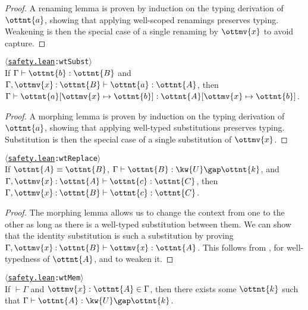 \documentclass[a4paper,UKenglish,cleveref,autoref,thm-restate]{lipics-v2021}
\newcommand{\repo}{https://github.com/ionathanch/TTBFL}
\newcommand{\thmref}[2]{%
  $\langle$\href{\repo/tree/main/src/#1}{\texttt{#1}}\texttt{:#2}$\rangle$%
}
\begin{document}
\begin{proof}
  A renaming lemma is proven by induction on the typing derivation of $\ottnt{a}$,
  showing that applying well-scoped renamings preserves typing.
  Weakening is then the special case of a single renaming by $\ottmv{x}$ to avoid capture.
\end{proof}

\begin{lemma}[Substitution (w.t.)] \thmref{safety.lean}{wtSubst} \label{lem:wt:subst} \\
  If $ \Gamma  \vdash  \ottnt{b}  \mathrel{:}  \ottnt{B} $ and $  \Gamma ,  \ottmv{x}  \mathbin{:}  \ottnt{B}   \vdash  \ottnt{a}  \mathrel{:}  \ottnt{A} $,
  then $ \Gamma  \vdash   \ottnt{a} [  \ottmv{x}  \mapsto  \ottnt{b}  ]   \mathrel{:}   \ottnt{A} [  \ottmv{x}  \mapsto  \ottnt{b}  ]  $.
\end{lemma}

\begin{proof}
  A morphing lemma is proven by induction on the typing derivation of $\ottnt{a}$,
  showing that applying well-typed substitutions preserves typing.
  Substitution is then the special case of a single substitution of $\ottmv{x}$.
\end{proof}

\begin{lemma}[Replacement (w.t.)] \thmref{safety.lean}{wtReplace} \label{lem:wt:replace} \\
  If $ \ottnt{A}  \equiv  \ottnt{B} $, $ \Gamma  \vdash  \ottnt{B}  \mathrel{:}   \kw{U} \gap  \ottnt{k}  $, and $  \Gamma ,  \ottmv{x}  \mathbin{:}  \ottnt{A}   \vdash  \ottnt{c}  \mathrel{:}  \ottnt{C} $,
  then $  \Gamma ,  \ottmv{x}  \mathbin{:}  \ottnt{B}   \vdash  \ottnt{c}  \mathrel{:}  \ottnt{C} $.
\end{lemma}

\begin{proof}
  The morphing lemma allows us to change the context from one to the other
  as long as there is a well-typed substitution between them.
  We can show that the identity substitution is such a substitution
  by proving $  \Gamma ,  \ottmv{x}  \mathbin{:}  \ottnt{B}   \vdash   \mathit{ \ottmv{x} }   \mathrel{:}  \ottnt{A} $.
  This follows from ,
   for well-typedness of $\ottnt{A}$,
  and  to weaken it.
\end{proof}

\begin{lemma} \thmref{safety.lean}{wtMem} \label{lem:wt:ctxt} \\
  If $ \mathop{\vdash}  \Gamma $ and $ \ottmv{x}  \mathrel{:}  \ottnt{A}  \in  \Gamma $,
  then there exists some $\ottnt{k}$ such that $ \Gamma  \vdash  \ottnt{A}  \mathrel{:}   \kw{U} \gap  \ottnt{k}  $.
\end{lemma}
\end{document}
